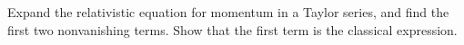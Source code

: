 Expand the relativistic
equation for momentum in a Taylor series, and find the
first two nonvanishing terms. Show that the first term is the classical
expression.
